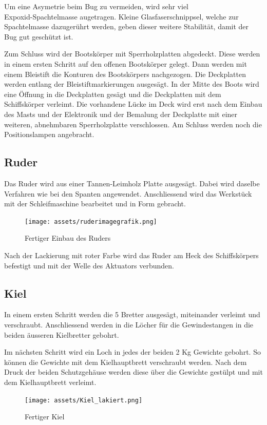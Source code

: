 Um eine Asymetrie beim Bug zu vermeiden, wird sehr viel \\Expoxid-Spachtelmasse augetragen. Kleine Glasfaserschnippsel, welche zur Spachtelmasse dazugerührt werden, geben dieser weitere Stabilität, damit der Bug gut geschützt ist.

Zum Schluss wird der Bootskörper mit Sperrholzplatten abgedeckt. Diese werden in einem ersten Schritt auf den offenen Bootskörper gelegt. Dann werden mit einem Bleistift die Konturen des Bootskörpers nachgezogen. Die Deckplatten werden entlang der Bleistiftmarkierungen ausgesägt. In der Mitte des Boots wird eine Öffnung in die Deckplatten gesägt und die Deckplatten mit dem Schiffskörper verleimt. Die vorhandene Lücke im Deck wird erst nach dem Einbau des Masts und der Elektronik und der Bemalung der Deckplatte mit einer weiteren, abnehmbaren Sperrholzplatte verschlossen. Am Schluss werden noch die Positionslampen angebracht. 
\subsection{Ruder}
Das Ruder wird aus einer Tannen-Leimholz Platte ausgesägt. Dabei wird daselbe Verfahren wie bei den Spanten angewendet. Anschliessend wird das Werkstück mit der Schleifmaschine bearbeitet und in Form gebracht. 
\begin{figure}[H]
    \centering
    \texttt{[image: assets/ruderimagegrafik.png]}
    \caption{Fertiger Einbau des Ruders}
    
\end{figure}

Nach der Lackierung mit roter Farbe wird das Ruder am Heck des Schiffskörpers befestigt und mit der Welle des Aktuators verbunden.
\subsection{Kiel}
In einem ersten Schritt werden die 5 Bretter ausgesägt, miteinander verleimt und verschraubt. Anschliessend werden in die Löcher für die Gewindestangen in die beiden äusseren Kielbretter gebohrt. 

Im nächsten Schritt wird ein Loch in jedes der beiden 2 Kg Gewichte gebohrt. So können die Gewichte mit dem Kielhauptbrett verschraubt werden. Nach dem Druck der beiden Schutzgehäuse werden diese über die Gewichte gestülpt und mit dem Kielhauptbrett verleimt.    
\begin{figure} [H]
    \centering
    \texttt{[image: assets/Kiel\_lakiert.png]}
    \caption{Fertiger Kiel}
    \label{fig:enter-label}
\end{figure}

